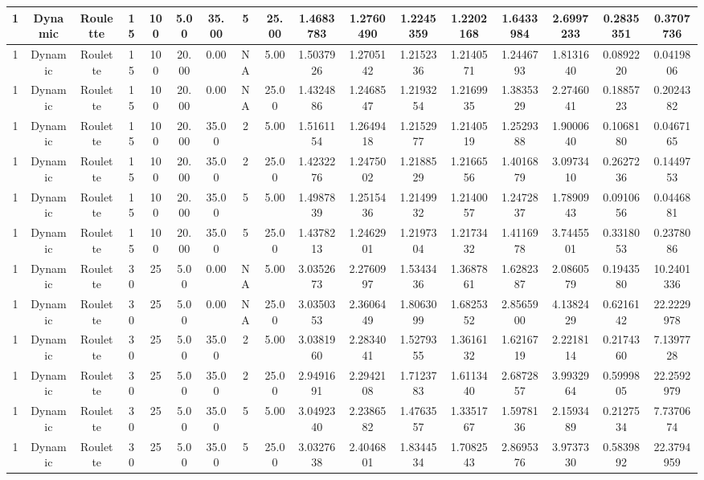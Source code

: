 \begin{longtable}{ | c | c | c | c | c | c | c | c | c | c | c | c | c | c | c | c | c | }
	\hline
	1	&	Dynamic	&	Roulette	&	15	&	100	&	5.00	&	35.00	&	5	&	25.00	&	1.4683783	&	1.2760490	&	1.2245359	&	1.2202168	&	1.6433984	&	2.6997233	&	0.2835351	&	0.3707736 \\
	\hline
	1	&	Dynamic	&	Roulette	&	15	&	100	&	20.00	&	0.00	&	NA	&	5.00	&	1.5037926	&	1.2705142	&	1.2152336	&	1.2140571	&	1.2446793	&	1.8131640	&	0.0892220	&	0.0419806 \\
	\hline
	1	&	Dynamic	&	Roulette	&	15	&	100	&	20.00	&	0.00	&	NA	&	25.00	&	1.4324886	&	1.2468547	&	1.2193254	&	1.2169935	&	1.3835329	&	2.2746041	&	0.1885723	&	0.2024382 \\
	\hline
	1	&	Dynamic	&	Roulette	&	15	&	100	&	20.00	&	35.00	&	2	&	5.00	&	1.5161154	&	1.2649418	&	1.2152977	&	1.2140519	&	1.2529388	&	1.9000640	&	0.1068180	&	0.0467165 \\
	\hline
	1	&	Dynamic	&	Roulette	&	15	&	100	&	20.00	&	35.00	&	2	&	25.00	&	1.4232276	&	1.2475002	&	1.2188529	&	1.2166556	&	1.4016879	&	3.0973410	&	0.2627236	&	0.1449753 \\
	\hline
	1	&	Dynamic	&	Roulette	&	15	&	100	&	20.00	&	35.00	&	5	&	5.00	&	1.4987839	&	1.2515436	&	1.2149932	&	1.2140057	&	1.2472837	&	1.7890943	&	0.0910656	&	0.0446881 \\
	\hline
	1	&	Dynamic	&	Roulette	&	15	&	100	&	20.00	&	35.00	&	5	&	25.00	&	1.4378213	&	1.2462901	&	1.2197304	&	1.2173432	&	1.4116978	&	3.7445501	&	0.3318053	&	0.2378086 \\
	\hline
	1	&	Dynamic	&	Roulette	&	30	&	25	&	5.00	&	0.00	&	NA	&	5.00	&	3.0352673	&	2.2760997	&	1.5343436	&	1.3687861	&	1.6282387	&	2.0860579	&	0.1943580	&	10.2401336 \\
	\hline
	1	&	Dynamic	&	Roulette	&	30	&	25	&	5.00	&	0.00	&	NA	&	25.00	&	3.0350353	&	2.3606449	&	1.8063099	&	1.6825352	&	2.8565900	&	4.1382429	&	0.6216142	&	22.2229978 \\
	\hline
	1	&	Dynamic	&	Roulette	&	30	&	25	&	5.00	&	35.00	&	2	&	5.00	&	3.0381960	&	2.2834041	&	1.5279355	&	1.3616132	&	1.6216719	&	2.2218114	&	0.2174360	&	7.1397728 \\
	\hline
	1	&	Dynamic	&	Roulette	&	30	&	25	&	5.00	&	35.00	&	2	&	25.00	&	2.9491691	&	2.2942108	&	1.7123783	&	1.6113440	&	2.6872857	&	3.9932964	&	0.5999805	&	22.2592979 \\
	\hline
	1	&	Dynamic	&	Roulette	&	30	&	25	&	5.00	&	35.00	&	5	&	5.00	&	3.0492340	&	2.2386582	&	1.4763557	&	1.3351767	&	1.5978136	&	2.1593489	&	0.2127534	&	7.7370674 \\
	\hline
	1	&	Dynamic	&	Roulette	&	30	&	25	&	5.00	&	35.00	&	5	&	25.00	&	3.0327638	&	2.4046801	&	1.8344534	&	1.7082543	&	2.8695376	&	3.9737330	&	0.5839892	&	22.3794959 \\

\end{longtable}
